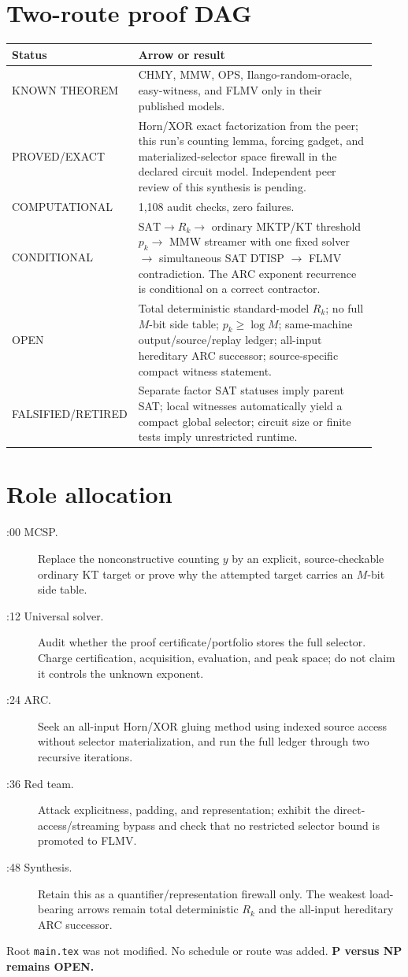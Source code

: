 \documentclass[11pt]{article}
\begin{document}
\section*{Two-route proof DAG}
\begin{center}
\begin{tabular}{p{0.17\linewidth}p{0.75\linewidth}}
\toprule
Status & Arrow or result\\
\midrule
KNOWN THEOREM & CHMY, MMW, OPS, Ilango-random-oracle, easy-witness, and FLMV only in their published models.\\
PROVED/EXACT & Horn/XOR exact factorization from the peer; this run's counting lemma, forcing gadget, and materialized-selector space firewall in the declared circuit model. Independent peer review of this synthesis is pending.\\
COMPUTATIONAL & 1,108 audit checks, zero failures.\\
CONDITIONAL & $\mathrm{SAT}\to R_k\to$ ordinary MKTP/KT threshold $p_k\to$ MMW streamer with one fixed solver $\to$ simultaneous SAT DTISP $\to$ FLMV contradiction.  The ARC exponent recurrence is conditional on a correct contractor.\\
OPEN & Total deterministic standard-model $R_k$; no full $M$-bit side table; $p_k\geq\log M$; same-machine output/source/replay ledger; all-input hereditary ARC successor; source-specific compact witness statement.\\
FALSIFIED/RETIRED & Separate factor SAT statuses imply parent SAT; local witnesses automatically yield a compact global selector; circuit size or finite tests imply unrestricted runtime.\\
\bottomrule
\end{tabular}
\end{center}

\section*{Role allocation}
\begin{description}
\item[:00 MCSP.] Replace the nonconstructive counting $y$ by an explicit,
source-checkable ordinary KT target or prove why the attempted target carries
an $M$-bit side table.
\item[:12 Universal solver.] Audit whether the proof certificate/portfolio
stores the full selector.  Charge certification, acquisition, evaluation, and
peak space; do not claim it controls the unknown exponent.
\item[:24 ARC.] Seek an all-input Horn/XOR gluing method using indexed source
access without selector materialization, and run the full ledger through two
recursive iterations.
\item[:36 Red team.] Attack explicitness, padding, and representation; exhibit
the direct-access/streaming bypass and check that no restricted selector bound
is promoted to FLMV.
\item[:48 Synthesis.] Retain this as a quantifier/representation firewall only.
The weakest load-bearing arrows remain total deterministic $R_k$ and the
all-input hereditary ARC successor.
\end{description}

Root \texttt{main.tex} was not modified.  No schedule or route was added.
\textbf{P versus NP remains OPEN.}

\end{document}
